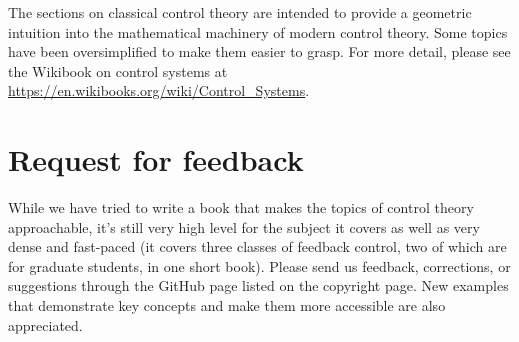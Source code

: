 The sections on classical control theory are intended to provide a geometric
intuition into the mathematical machinery of modern control theory. Some topics
have been oversimplified to make them easier to grasp. For more detail, please
see the Wikibook on control systems at
\url{https://en.wikibooks.org/wiki/Control_Systems}.

\section{Request for feedback}

While we have tried to write a book that makes the topics of control theory
approachable, it's still very high level for the subject it covers as well as
very dense and fast-paced (it covers three classes of feedback control, two of
which are for graduate students, in one short book). Please send us feedback,
corrections, or suggestions through the GitHub page listed on the copyright
page. New examples that demonstrate key concepts and make them more accessible
are also appreciated.
